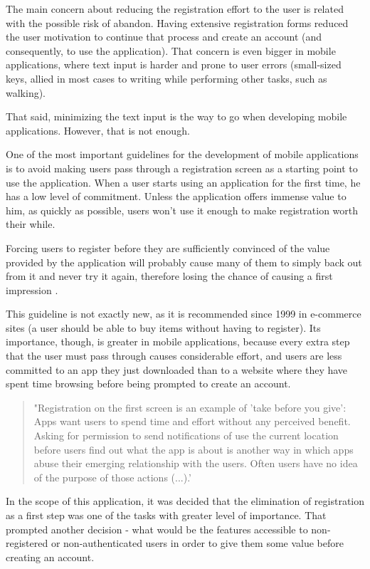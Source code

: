 The main concern about reducing the registration effort to the user is related with the possible risk of abandon. Having extensive registration forms reduced the user motivation to continue that process and create an account (and consequently, to use the application). That concern is even bigger in mobile applications, where text input is harder and prone to user errors (small-sized keys, allied in most cases to writing while performing other tasks, such as walking).

That said, minimizing the text input is the way to go when developing mobile applications. However, that is not enough.

One of the most important guidelines for the development of mobile applications is to avoid making users pass through a registration screen as a starting point to use the application. 
When a user starts using an application for the first time, he has a low level of commitment. Unless the application offers immense value to him, as quickly as possible, users won't use it enough to make registration worth their while. 

Forcing users to register before they are sufficiently convinced of the value provided by the application will probably cause many of them to simply back out from it and never try it again, therefore losing the chance of causing a first impression \cite{kn: MobileUsab}.

This guideline is not exactly new, as it is recommended since 1999 in e-commerce sites (a user should be able to buy items without having to register). Its importance, though, is greater in mobile applications, because every extra step that the user must pass through causes considerable effort, and users are less committed to an app they just downloaded than to a website where they have spent time browsing before being prompted to create an account.

\begin{quote}
"Registration on the first screen is an example of 'take before you give': Apps want users to spend time and effort without any perceived benefit. Asking for permission to send notifications of use the current location before users find out what the app is about is another way in which apps abuse their emerging relationship with the users. Often users have no idea of the purpose of those actions (...).' \cite{kn: MobileUsab}
\end{quote}


In the scope of this application, it was decided that the elimination of registration as a first step was one of the tasks with greater level of importance. That prompted another decision - what would be the features accessible to non-registered or non-authenticated users in order to give them some value before creating an account. 

